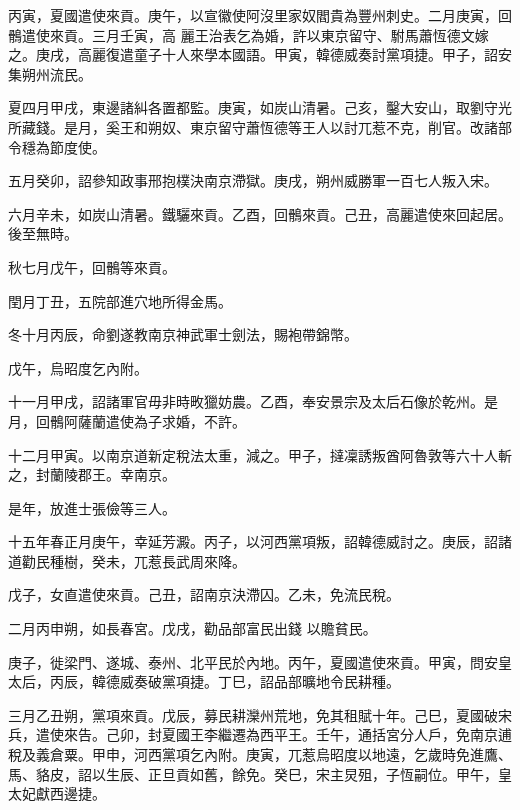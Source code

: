 \begin{pinyinscope}
 丙寅，夏國遣使來貢。庚午，以宣徽使阿沒里家奴閻貴為豐州刺史。二月庚寅，回鶻遣使來貢。三月壬寅，高
 麗王治表乞為婚，許以東京留守、駙馬蕭恆德文嫁之。庚戌，高麗復遣童子十人來學本國語。甲寅，韓德威奏討黨項捷。甲子，詔安集朔州流民。



 夏四月甲戌，東邊諸糾各置都監。庚寅，如炭山清暑。己亥，鑿大安山，取劉守光所藏錢。是月，奚王和朔奴、東京留守蕭恆德等王人以討兀惹不克，削官。改諸部令穩為節度使。



 五月癸卯，詔參知政事邢抱樸決南京滯獄。庚戌，朔州威勝軍一百七人叛入宋。



 六月辛未，如炭山清暑。鐵驪來貢。乙酉，回鶻來貢。己丑，高麗遣使來回起居。後至無時。



 秋七月戊午，回鶻等來貢。



 閏月丁丑，五院部進穴地所得金馬。



 冬十月丙辰，命劉遂教南京神武軍士劍法，賜袍帶錦幣。



 戊午，烏昭度乞內附。



 十一月甲戌，詔諸軍官毋非時畋獵妨農。乙酉，奉安景宗及太后石像於乾州。是月，回鶻阿薩蘭遣使為子求婚，不許。



 十二月甲寅。以南京道新定稅法太重，減之。甲子，撻凜誘叛酋阿魯敦等六十人斬之，封蘭陵郡王。幸南京。



 是年，放進士張儉等三人。



 十五年春正月庚午，幸延芳澱。丙子，以河西黨項叛，詔韓德威討之。庚辰，詔諸道勸民種樹，癸未，兀惹長武周來降。



 戊子，女直遣使來貢。己丑，詔南京決滯囚。乙未，免流民稅。



 二月丙申朔，如長春宮。戊戌，勸品部富民出錢
 以贍貧民。



 庚子，徙梁門、遂城、泰州、北平民於內地。丙午，夏國遣使來貢。甲寅，問安皇太后，丙辰，韓德威奏破黨項捷。丁巳，詔品部曠地令民耕種。



 三月乙丑朔，黨項來貢。戊辰，募民耕灤州荒地，免其租賦十年。己巳，夏國破宋兵，遣使來告。己卯，封夏國王李繼遷為西平王。壬午，通括宮分人戶，免南京逋稅及義倉粟。甲申，河西黨項乞內附。庚寅，兀惹烏昭度以地遠，乞歲時免進鷹、馬、貉皮，詔以生辰、正旦貢如舊，餘免。癸巳，宋主炅殂，子恆嗣位。甲午，皇太妃獻西邊捷。




\end{pinyinscope}
